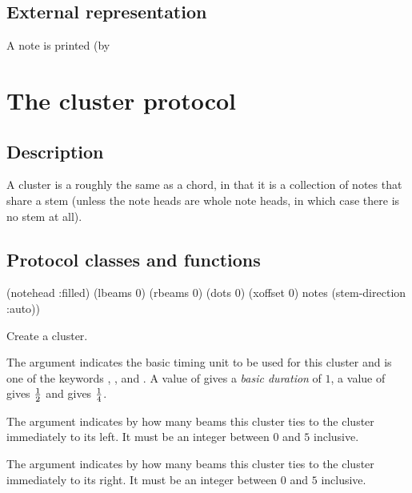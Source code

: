 \subsection{External representation}

A note is printed (by 

\section{The cluster protocol}

\subsection{Description}

A cluster is a roughly the same as a chord, in that it is a collection
of notes that share a stem  (unless the note heads are whole note
heads, in which case there is no stem at all).  

\subsection{Protocol classes and functions}


 {\key (notehead :filled) (lbeams 0) (rbeams 0)
		       (dots 0) (xoffset 0) notes (stem-direction :auto))}

Create a cluster.

The  argument indicates the basic timing unit to be
used for this cluster and is one of the keywords ,
, and .  A value of 
gives a \emph{basic duration} of $1$, a value of  gives $1
\over 2$ and  gives $1 \over 4$. 

The  argument indicates by how many beams this cluster
ties to the cluster immediately to its left.  It must be an integer
between $0$ and $5$ inclusive. 

The  argument indicates by how many beams this cluster
ties to the cluster immediately to its right.  It must be an integer
between $0$ and $5$ inclusive. 

